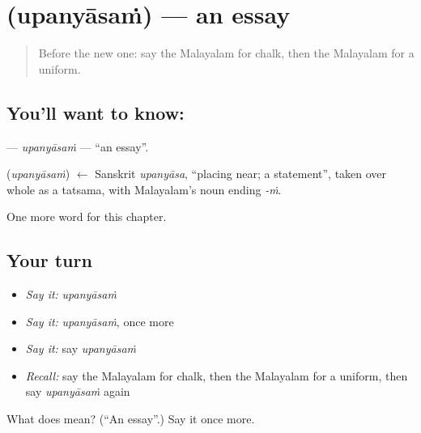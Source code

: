 \section[\texorpdfstring{\ml{ഉപന്യാസം} (upanyāsaṁ)}{ഉപന്യാസം (upanyāsaṁ)}]{ (upanyāsaṁ) — an essay}

\label{lesson:ML-C337-upanyasam}



\begin{quote}
Before the new one: say the Malayalam for chalk, then the Malayalam for a uniform.
\end{quote}

\subsection*{You'll want to know: }
\textbf{} — \emph{upanyāsaṁ} — \textquotedblleft{}an essay\textquotedblright{}.

\begin{cousinweb}
\textbf{} (\emph{upanyāsaṁ}) $\leftarrow$ Sanskrit \emph{upanyāsa}, \textquotedblleft{}placing near; a statement\textquotedblright{}, taken over whole as a tatsama, with Malayalam's noun ending \emph{-ṁ}.
\end{cousinweb}

\begin{grammarlens}[title={What you've built}]
One more word for this chapter.
\end{grammarlens}

\subsection*{Your turn}
\begin{itemize}
\raggedright
  \item \emph{Say it:} \emph{upanyāsaṁ}
  \item \emph{Say it:} \emph{upanyāsaṁ}, once more
  \item \emph{Say it:} say \emph{upanyāsaṁ}
  \item \emph{Recall:} say the Malayalam for chalk, then the Malayalam for a uniform, then say \emph{upanyāsaṁ} again
\end{itemize}

\begin{tcolorbox}[breakable,colback=teal!4,colframe=teal!35!black,title={Before you move on}]
What does  mean? (\textquotedblleft{}An essay\textquotedblright{}.) Say it once more.
\end{tcolorbox}
